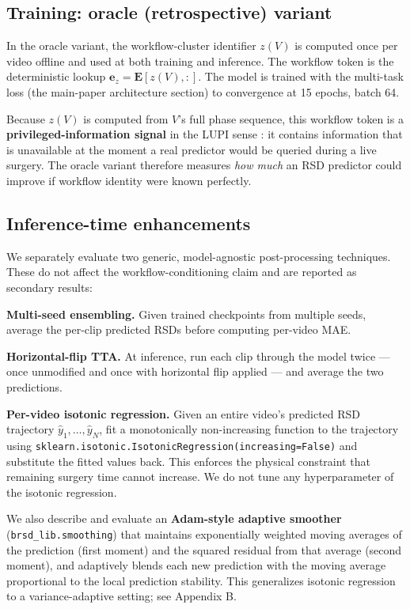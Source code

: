 \subsection{Training: oracle (retrospective)
variant}\label{training-oracle-retrospective-variant}

In the oracle variant, the workflow-cluster identifier \(z(V)\) is
computed once per video offline and used at both training and inference.
The workflow token is the deterministic lookup
\(\mathbf{e}_z = \mathbf{E}[z(V), :]\). The model is trained with the
multi-task loss (the main-paper architecture section) to convergence at 15 epochs, batch 64.

Because \(z(V)\) is computed from \(V\)'s full phase sequence, this
workflow token is a \textbf{privileged-information signal} in the LUPI
sense \citep{vapnik2009lupi}: it contains information that is
unavailable at the moment a real predictor would be queried during a
live surgery. The oracle variant therefore measures \emph{how much} an
RSD predictor could improve if workflow identity were known perfectly.

\subsection{Inference-time enhancements}\label{inference-time-enhancements}

We separately evaluate two generic, model-agnostic post-processing
techniques. These do not affect the workflow-conditioning claim and are
reported as secondary results:

\textbf{Multi-seed ensembling.} Given trained checkpoints from multiple
seeds, average the per-clip predicted RSDs before computing per-video
MAE.

\textbf{Horizontal-flip TTA.} At inference, run each clip through the
model twice --- once unmodified and once with horizontal flip applied
--- and average the two predictions.

\textbf{Per-video isotonic regression.} Given an entire video's
predicted RSD trajectory \(\hat y_1, \ldots, \hat y_N\), fit a
monotonically non-increasing function to the trajectory using
\texttt{sklearn.isotonic.IsotonicRegression(increasing=False)} and
substitute the fitted values back. This enforces the physical constraint
that remaining surgery time cannot increase. We do not tune any
hyperparameter of the isotonic regression.

We also describe and evaluate an \textbf{Adam-style adaptive smoother}
(\texttt{brsd\_lib.smoothing}) that maintains exponentially weighted
moving averages of the prediction (first moment) and the squared
residual from that average (second moment), and adaptively blends each
new prediction with the moving average proportional to the local
prediction stability. This generalizes isotonic regression to a
variance-adaptive setting; see Appendix B.


